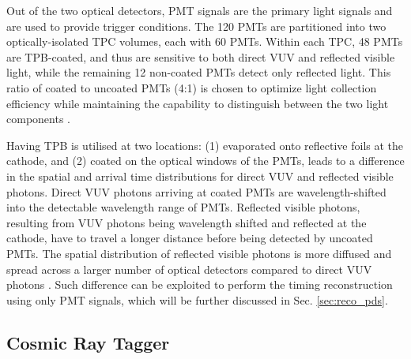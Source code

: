 Out of the two optical detectors, PMT signals are the primary light signals and are used to provide trigger conditions.
The 120 PMTs are partitioned into two optically-isolated TPC volumes, each with 60 PMTs.
Within each TPC, 48 PMTs are TPB-coated, and thus are sensitive to both direct VUV and reflected visible light, while the remaining 12 non-coated PMTs detect only reflected light. 
This ratio of coated to uncoated PMTs (4:1) is chosen to optimize light collection efficiency while maintaining the capability to distinguish between the two light components \cite{sbnd_pds_paper}. 

Having TPB is utilised at two locations: (1) evaporated onto reflective foils at the cathode, and (2) coated on the optical windows of the PMTs, leads to a difference in the spatial and arrival time distributions for direct VUV and reflected visible photons.
Direct VUV photons arriving at coated PMTs are wavelength-shifted into the detectable wavelength range of PMTs.
Reflected visible photons, resulting from VUV photons being wavelength shifted and reflected at the cathode, have to travel a longer distance before being detected by uncoated PMTs.
The spatial distribution of reflected visible photons is more diffused and spread across a larger number of optical detectors compared to direct VUV photons \cite{PatrickPhD}.
Such difference can be exploited to perform the timing reconstruction using only PMT signals, which will be further discussed in Sec. \ref{sec:reco_pds}.


\subsection{Cosmic Ray Tagger}
\label{sec:sbnd_crt}

